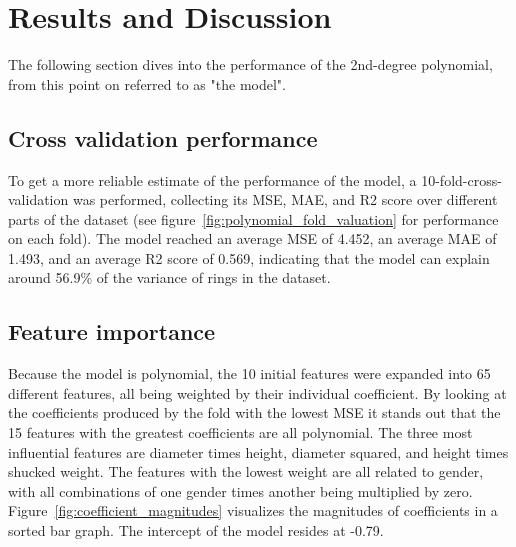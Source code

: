 \documentclass[twocolumn]{article}
\begin{document}
\section{Results and Discussion}

The following section dives into the performance of the 2nd-degree polynomial, from this point on referred to as "the model".

\subsection{Cross validation performance}

To get a more reliable estimate of the performance of the model, a 10-fold-cross-validation was performed, collecting its MSE, MAE, and R2 score over different parts of the dataset (see figure~\ref{fig:polynomial_fold_valuation} for performance on each fold).
The model reached an average MSE of 4.452, an average MAE of 1.493, and an average R2 score of 0.569, indicating that the model can explain around 56.9\% of the variance of rings in the dataset.

\subsection{Feature importance}

Because the model is polynomial, the 10 initial features were expanded into 65 different features, all being weighted by their individual coefficient. By looking at the coefficients produced by the fold with the lowest MSE it stands out that the 15 features with the greatest coefficients are all polynomial. The three most influential features are diameter times height, diameter squared, and height times shucked weight. The features with the lowest weight are all related to gender, with all combinations of one gender times another being multiplied by zero. Figure~\ref{fig:coefficient_magnitudes} visualizes the magnitudes of coefficients in a sorted bar graph. The intercept of the model resides at -0.79.
\end{document}
